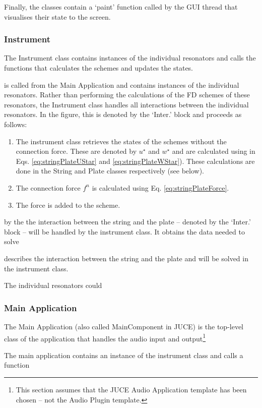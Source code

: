 Finally, the classes contain a `paint' function called by the GUI thread that visualises their state to the screen. 

\subsubsection{Instrument}
The Instrument class contains instances of the individual resonators and calls the functions that calculates the schemes and updates the states.

is called from the Main Application and contains instances of the individual resonators. Rather than performing the calculations of the FD schemes of these resonators, the Instrument class handles all interactions between the individual resonators. In the figure, this is denoted by the `Inter.' block and proceeds as follows:
\begin{enumerate}
    \item The instrument class retrieves the states of the schemes without the connection force. These are denoted by $u^\star$ and $w^\star$ and are calculated using in Eqs. \eqref{eq:stringPlateUStar} and \eqref{eq:stringPlateWStar}). These calculations are done in the String and Plate classes respectively (see below).
    \item The connection force $f^n$ is calculated using Eq. \eqref{eq:stringPlateForce}.
    \item The force is added to the scheme. 
\end{enumerate}

by the  the interaction between the string and the plate -- denoted by the `Inter.' block -- will be handled by the instrument class. It obtains the data needed to solve 

describes the interaction between the string and the plate and will be solved in the instrument class. 



The individual resonators could 


\subsubsection{Main Application}
The Main Application (also called MainComponent in JUCE) is the top-level class of the application that handles the audio input and output\footnote{This section assumes that the JUCE Audio Application template has been chosen -- not the Audio Plugin template.}

The main application contains an instance of the instrument class and calls a function 

